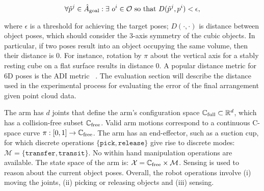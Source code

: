 \vspace*{-5mm}
\begin{equation}
\forall \hat{p}^j \in \hat{A}_{\rm goal}: \exists\  o^i \in \mathcal{O} \textrm{ so that } D(\hat{p}^j, p^i) < \epsilon,
\label{eq:satisfaction}
\end{equation}

\noindent where $\epsilon$ is a threshold for achieving the target poses; $D(\cdot,\cdot)$ is distance between object poses, which should consider the 3-axis symmetry of the cubic objects. In particular, if two poses result into an object occupying the same volume, then their distance is 0. For instance, rotation by $\pi$ about the vertical axis for a stably resting cube on a flat surface results in distance 0. A popular distance metric for 6D poses is the ADI metric ~\cite{hinterstoisser2012model}. The evaluation section will describe the distance used in the experimental process for evaluating the error of the final arrangement given point cloud data.



The arm has $d$ joints that define the arm's configuration space $\mathbb{C}_{{\rm full}} \subset \mathbb{R}^d$, which has a collision-free subset $\mathbb{C}_{{\rm free}}$. Valid arm motions correspond to a continuous C-space curve $\pi : [0,1] \rightarrow \mathbb{C}_{{\rm free}}$.  The arm has an end-effector, such as a suction cup, for which discrete operations $\{ \mathtt{pick}, \mathtt{release} \}$ give rise to discrete modes: $\mathcal{M} = \{ \mathtt{transfer}, \mathtt{transit} \}$. No within hand manipulation operations are available. The state space of the arm is: $\mathcal{X} = \mathbb{C}_{{\rm free}} \times \mathcal{M}$. Sensing is used to reason about the current object poses. Overall, the robot operations involve (i) moving the joints, (ii) picking or releasing objects and (iii) sensing.


